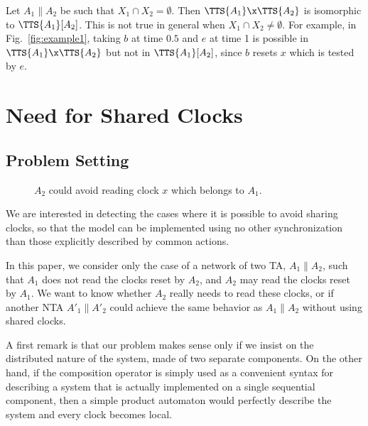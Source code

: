 \documentclass{LMCS}
\theoremstyle{plain}\newtheorem*{prop11}{Proposition~\ref{prop:states} bis}
\begin{document}
\begin{rem}\label{rem:disjoint_clocksets}
  Let $A_1\parallel A_2$ be such that $X_1\cap X_2=\emptyset$. Then
  $\TTS{A_1}\x\TTS{A_2}$ is isomorphic to $\TTS{A_1}[A_2]$.
  This is not true in general when $X_1\cap X_2\neq\emptyset$.
  For example, in Fig.~\ref{fig:example1}, taking $b$ at time $0.5$ and
  $e$ at time 1 is possible in $\TTS{A_1}\x\TTS{A_2}$ but not in
  $\TTS{A_1}[A_2]$, since $b$ resets $x$ which is tested by
  $e$.
\end{rem}






\section{Need for Shared Clocks}
\label{sec:nsc_problem_setting}

\subsection{Problem Setting}
\begin{figure}[t]
  \centering
  \caption{$A_2$ could avoid reading clock $x$ which belongs to $A_1$.}
  \label{fig:example0}
\end{figure}
We are interested in detecting the cases where it is possible to avoid sharing
clocks, so that the model can be implemented using no other synchronization than
those explicitly described by common actions.

In this paper, we consider only the case of a network of two TA, $A_1\parallel
A_2$, such that $A_1$ does not read the clocks reset by $A_2$, and $A_2$
may read the clocks reset by $A_1$.
We want to know whether $A_2$ really needs to read these clocks,
or if another NTA $A'_1 \parallel A'_2$ could achieve the same
behavior as $A_1 \parallel A_2$ without using shared clocks.

A first remark is that our problem makes sense only if we insist on the
distributed nature of the system, made of two separate components. On the other
hand, if the composition operator is simply used as a convenient syntax for
describing a system that is actually implemented on a single sequential
component, then a simple product automaton would perfectly describe the system
and every clock becomes local.
\end{document}
